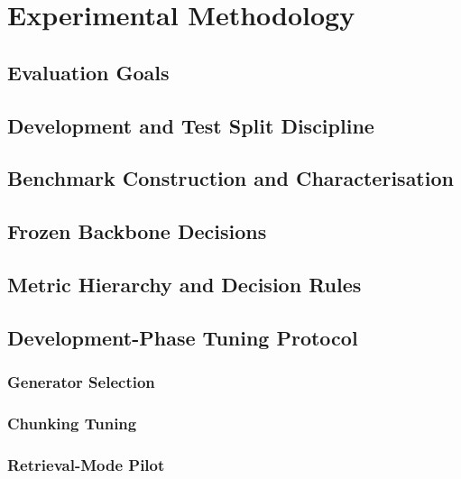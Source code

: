 \chapter{Experimental Methodology}
\label{cha:methodology}

\section{Evaluation Goals}
\label{sec:evaluation-goals}

\section{Development and Test Split Discipline}
\label{sec:dev-test-split}

\section{Benchmark Construction and Characterisation}
\label{sec:benchmark-construction-characterisation}

\section{Frozen Backbone Decisions}
\label{sec:frozen-backbone-decisions}

\section{Metric Hierarchy and Decision Rules}
\label{sec:metric-hierarchy-decision-rules}

\section{Development-Phase Tuning Protocol}
\label{sec:dev-phase-tuning-protocol}

\subsection{Generator Selection}
\label{sec:generator-selection}

\subsection{Chunking Tuning}
\label{sec:chunking-tuning}

\subsection{Retrieval-Mode Pilot}
\label{sec:retrieval-mode-pilot}

